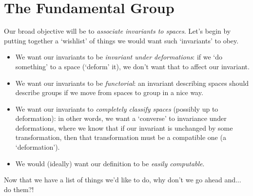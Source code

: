 \chapter{The Fundamental Group} \label{Ch1:CH}
\thispagestyle{empty}

Our broad objective will be to \textit{associate invariants to spaces}. Let's begin by putting together a `wishlist' of things we would want such `invariants' to obey.
\begin{itemize}
    \item We want our invariants to be \textit{invariant under deformations}: if we `do something' to a space (`deform' it), we don't want that to affect our invariant.

    \item We want our invariants to be \textit{functorial}: an invariant describing spaces should describe groups if we move from spaces to group in a nice way.

    \item We want our invariants to \textit{completely classify spaces} (possibly up to deformation): in other words, we want a `converse' to invariance under deformations, where we know that if our invariant is unchanged by some transformation, then that transformation must be a compatible one (a `deformation').

    \item We would (ideally) want our definition to be \textit{easily computable}.
\end{itemize}

Now that we have a list of things we'd like to do, why don't we go ahead and... do them?!





